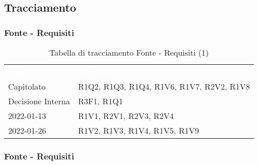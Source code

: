 \subsection{Tracciamento}

\subsubsection{Fonte - Requisiti}


\begin{table}[!htbp]
\renewcommand{\arraystretch}{1.5}
\begin{tabular}{ m{}<{\centering}  m{}<{\centering} }
	\rowcolor{darkblue}
	\textcolor{white}{\textbf{Fonte}} &\textcolor{white}{\textbf{Requisiti}}\\ 

	Capitolato & R1Q2, R1Q3, R1Q4, R1V6, R1V7, R2V2, R1V8\\	

	Decisione Interna & R3F1, R1Q1 \\
	
	\Vi{} 2022-01-13 & R1V1, R2V1, R2V3, R2V4 \\
	
	\Ve{} 2022-01-26 & R1V2, R1V3, R1V4, R1V5, R1V9 \\

\end{tabular}
\caption{Tabella di tracciamento Fonte - Requisiti (1)}
\end{table}

\pagebreak
\subsubsection{Fonte - Requisiti}

